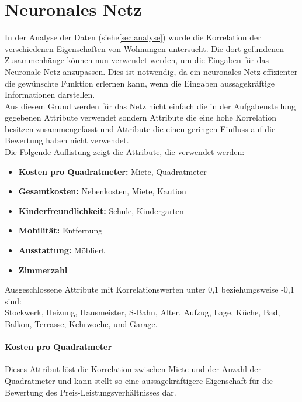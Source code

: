 \section{Neuronales Netz}\label{sec:nn}
In der Analyse der Daten (siehe\autoref{sec:analyse}) wurde die Korrelation 
der verschiedenen Eigenschaften von Wohnungen untersucht. Die dort gefundenen
Zusammenhänge können nun verwendet werden, um die Eingaben für das Neuronale 
Netz anzupassen. Dies ist notwendig, da ein neuronales Netz effizienter
die gewünschte Funktion erlernen kann, wenn die Eingaben aussagekräftige 
Informationen darstellen. \\
Aus diesem Grund werden für das Netz nicht einfach die in der Aufgabenstellung 
gegebenen Attribute verwendet sondern Attribute die eine hohe Korrelation besitzen
zusammengefasst und Attribute die einen geringen Einfluss auf die Bewertung haben
nicht verwendet. \\
Die Folgende Auflistung zeigt die Attribute, die verwendet werden: 
\begin{itemize}
    \item \textbf{Kosten pro Quadratmeter:} Miete, Quadratmeter
    \item \textbf{Gesamtkosten:} Nebenkosten, Miete, Kaution
    \item \textbf{Kinderfreundlichkeit:} Schule, Kindergarten
    \item \textbf{Mobilität:} Entfernung
    \item \textbf{Ausstattung:} Möbliert
    \item \textbf{Zimmerzahl}
\end{itemize}

Ausgeschlossene Attribute mit Korrelationswerten unter 0,1 beziehungsweise -0,1 sind:\\
Stockwerk, Heizung, Hausmeister, S-Bahn, Alter, Aufzug, Lage, Küche, Bad, Balkon, Terrasse, Kehrwoche, 
und Garage.

\paragraph{Kosten pro Quadratmeter}
Dieses Attribut löst die Korrelation zwischen Miete und der Anzahl der Quadratmeter und kann 
stellt so eine aussagekräftigere Eigenschaft für die Bewertung des Preis-Leistungsverhältnisses dar.


